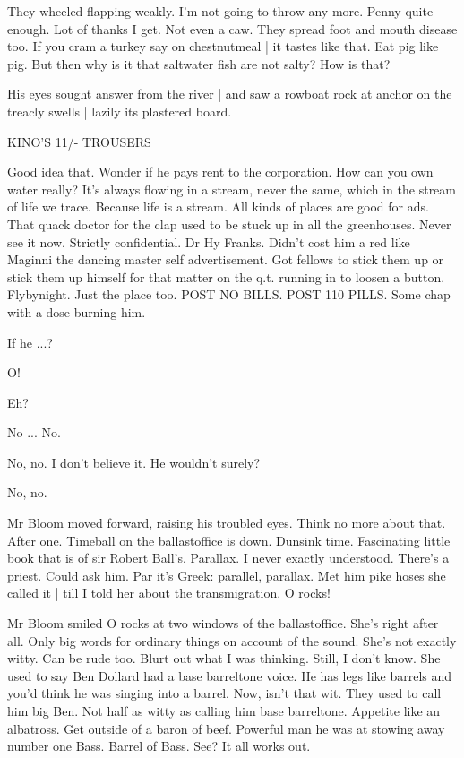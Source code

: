 They wheeled flapping weakly.
I'm not going to throw any more.
Penny quite enough.
Lot of thanks I get.
Not even a caw.
They spread foot and mouth disease too.
If you cram a turkey say on chestnutmeal |
it tastes like that.
Eat pig like pig.
But then why is it that saltwater fish are not salty?
How is that?

His eyes sought answer from the river |
and saw a rowboat rock at anchor on the treacly swells |
lazily its plastered board.

KINO'S
11/-
TROUSERS

Good idea that.
Wonder if he pays rent to the corporation.
How can you own water really?
It's always flowing in a stream,
never the same,
which in the stream of life we trace.
Because life is a stream.
All kinds of places are good for ads.
That quack doctor for the clap used to be stuck up in all the greenhouses.
Never see it now.
Strictly confidential.
Dr Hy Franks.
Didn't cost him a red
like Maginni the dancing master
self advertisement.
Got fellows to stick them up
or stick them up himself
for that matter
on the q.t. running in to loosen a button.
Flybynight.
Just the place too.
POST NO BILLS.
POST 110 PILLS.
Some chap with a dose burning him.

If he ...?

O!

Eh?

No ...
No.

No, no.
I don't believe it.
He wouldn't surely?

No, no.

Mr Bloom moved forward, raising his troubled eyes.
Think no more about that.
After one.
Timeball on the ballastoffice is down.
Dunsink time.
Fascinating little book that is of sir Robert Ball's.
Parallax.
I never exactly understood.
There's a priest.
Could ask him.
Par it's Greek:
parallel, parallax.
Met him pike hoses she called it |
till I told her about the transmigration.
O rocks!

Mr Bloom smiled O rocks at two windows of the ballastoffice.
She's right after all.
Only big words for ordinary things on account of the sound.
She's not exactly witty.
Can be rude too.
Blurt out what I was thinking.
Still, I don't know.
She used to say Ben Dollard had a base barreltone voice.
He has legs like barrels and you'd think he was singing into a barrel.
Now, isn't that wit.
They used to call him big Ben.
Not half as witty as calling him base barreltone.
Appetite like an albatross.
Get outside of a baron of beef.
Powerful man he was at stowing away number one Bass.
Barrel of Bass.
See?
It all works out.


